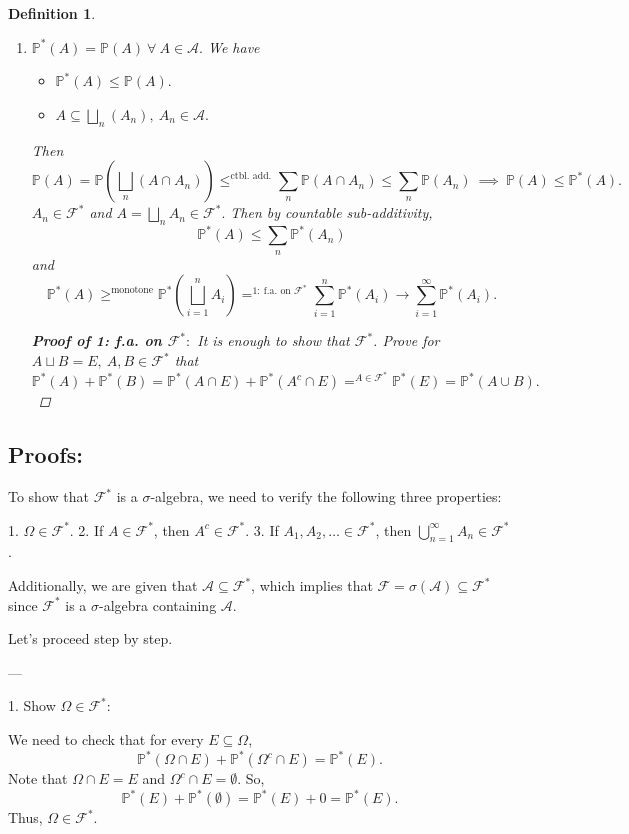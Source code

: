 \documentclass{article}
\newcommand{\1}{\mathds{1}}
\newcommand{\F}{\mathcal{F}}
\newcommand{\PB}{\mathbb{P}}
\newcommand{\A}{\mathcal{A}}
\newcommand{\lf}{\left}
\newcommand{\rg}{\right}
\newtheorem{definition}[theorem]{Definition}
\begin{document}
\begin{definition}
\begin{enumerate}
       \item $\PB^*(A)=\PB(A)\ \forall\ A\in\A.$ We have 
       \begin{itemize}
           \item $\PB^*(A)\leq \PB(A).$
           \item $A\subseteq\bigsqcup_n(A_n),\ A_n\in\A.$
       \end{itemize}
       Then $$\PB(A)=\PB\lf(\bigsqcup_n(A\cap A_n)\rg)\leq^\text{ctbl. add.}\sum_n\PB(A\cap A_n)\leq \sum_n\PB(A_n)\ \implies\ \PB(A)\leq\PB^*(A).$$
       $A_n\in\F^*$ and $A=\bigsqcup_n A_n\in\F^*.$ Then by countable sub-additivity, $$\PB^*(A)\leq \sum_n \PB^*(A_n)$$ and $$\PB^*(A)\geq^\text{monotone}\PB^*\lf(\bigsqcup_{i=1}^nA_i\rg)=^{1:\ \text{f.a. on }\F^*}\sum_{i=1}^n \PB^*(A_i)\to \sum_{i=1}^\infty\PB^*(A_i).$$
       \begin{proof}[\textbf{Proof of 1: f.a. on $\mathbf{\F^*:}$} It is enough to show that $\mathbf{\F^*}$]
           Prove for $A\sqcup B=E,\ A,B\in\F^*$ that $$\PB^*(A)+\PB^*(B)=\PB^*(A\cap E)+\PB^*(A^c\cap E)=^{A\in\F^*}\PB^*(E)=\PB^*(A\cup B).$$
       \end{proof}
   \end{enumerate}
\end{definition}
\subsection{Proofs:}
To show that \(\mathcal{F}^*\) is a \(\sigma\)-algebra, we need to verify the following three properties:

1. \(\Omega \in \mathcal{F}^*\).
2. If \(A \in \mathcal{F}^*\), then \(A^c \in \mathcal{F}^*\).
3. If \(A_1, A_2, \dots \in \mathcal{F}^*\), then \(\bigcup_{n=1}^\infty A_n \in \mathcal{F}^*\).

Additionally, we are given that \(\mathcal{A} \subseteq \mathcal{F}^*\), which implies that \(\mathcal{F} = \sigma(\mathcal{A}) \subseteq \mathcal{F}^*\) since \(\mathcal{F}^*\) is a \(\sigma\)-algebra containing \(\mathcal{A}\).

Let's proceed step by step.

---

       1. Show \(\Omega \in \mathcal{F}^*\):

We need to check that for every \(E \subseteq \Omega\),
\[
\mathbb{P}^*(\Omega \cap E) + \mathbb{P}^*(\Omega^c \cap E) = \mathbb{P}^*(E).
\]
Note that \(\Omega \cap E = E\) and \(\Omega^c \cap E = \emptyset\). So,
\[
\mathbb{P}^*(E) + \mathbb{P}^*(\emptyset) = \mathbb{P}^*(E) + 0 = \mathbb{P}^*(E).
\]
Thus, \(\Omega \in \mathcal{F}^*\).
\end{document}
